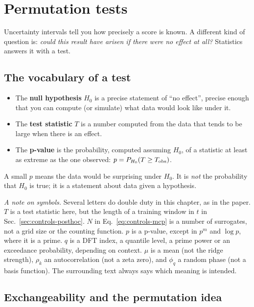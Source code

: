 \section{Permutation tests}\label{sec:controls-permutation}

Uncertainty intervals tell you how precisely a score is known. A different kind of question is: \emph{could this result have arisen if there were no effect at all?} Statistics answers it with a test.

\subsection{The vocabulary of a test}

\begin{itemize}
\item The \textbf{null hypothesis} $H_0$ is a precise statement of ``no effect'', precise enough that you can compute (or simulate) what data would look like under it.
\item The \textbf{test statistic} $T$ is a number computed from the data that tends to be large when there is an effect.
\item The \textbf{p-value} is the probability, computed assuming $H_0$, of a statistic at least as extreme as the one observed: $p=P_{H_0}(T\ge T_{\rm obs})$.
\end{itemize}
A small $p$ means the data would be surprising under $H_0$. It is \emph{not} the probability that $H_0$ is true; it is a statement about data given a hypothesis.

\emph{A note on symbols.} Several letters do double duty in this chapter, as in the paper. $T$ is a test statistic here, but the length of a training window in $t$ in Sec.~\ref{sec:controls-posthoc}. $N$ in Eq.~\eqref{eq:controls-mcp} is a number of surrogates, not a grid size or the counting function. $p$ is a p-value, except in $p^m$ and $\log p$, where it is a prime. $q$ is a DFT index, a quantile level, a prime power or an exceedance probability, depending on context. $\mu$ is a mean (not the ridge strength), $\rho_k$ an autocorrelation (not a zeta zero), and $\phi_q$ a random phase (not a basis function). The surrounding text always says which meaning is intended.

\subsection{Exchangeability and the permutation idea}

